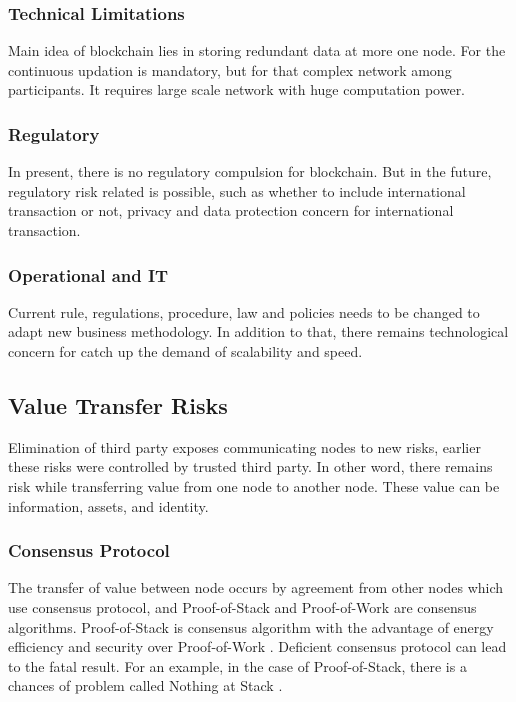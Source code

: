\documentclass[a4paper,twoside,12pt]{report}
\begin{document}
\begin{spacing}{1.5}
\subsubsection{Technical Limitations}
Main idea of blockchain lies in storing redundant data at more one node. For the continuous updation is mandatory, but for that complex network among participants. It requires large scale network with huge computation power.  
\cite{fangfangdai}
\subsubsection{Regulatory}
In present, there is no regulatory compulsion for blockchain. But in the future, regulatory risk related is possible, such as whether to include international transaction or not, privacy and data protection concern for international transaction.    
\subsubsection{Operational and IT}
Current rule, regulations, procedure, law and policies needs to be changed to adapt new business methodology. In addition to that, there remains technological concern for catch up the demand of scalability and speed.   
\subsection{Value Transfer Risks}
Elimination of third party exposes communicating nodes to new risks, earlier these risks were controlled by trusted third party. In other word, there remains risk while transferring value from one node to another node. These value can be information, assets, and identity.
\subsubsection{Consensus Protocol}
The transfer of value between node occurs by agreement from other nodes which use consensus protocol, and
Proof-of-Stack and Proof-of-Work are consensus algorithms. Proof-of-Stack is consensus algorithm with the advantage of energy efficiency and security over Proof-of-Work \cite{saad_exploring_2019}. Deficient consensus protocol can lead to the fatal result. For an example, in the case of Proof-of-Stack, there is a chances of  problem called Nothing at Stack \cite{wiki:proofofwork}.  

\end{spacing}
\end{document}
